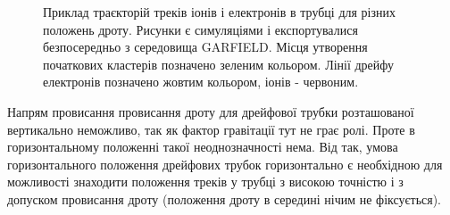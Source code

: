 	\begin{figure}[h!]
		\centering
		\qquad
		\caption{ Приклад траєкторій треків іонів і електронів в трубці для різних положень дроту. Рисунки є симуляціями і експортувалися безпосередньо з середовища GARFIELD. Місця утворення початкових кластерів позначено зеленим кольором. Лінії дрейфу електронів позначено жовтим кольором, іонів - червоним.}
	\end{figure}
	
	Напрям провисання провисання дроту для дрейфової трубки розташованої вертикально неможливо, так як фактор гравітації тут не грає ролі. Проте в горизонтальному положенні такої неоднозначності нема. Від так, умова горизонтального положення дрейфових трубок горизонтально є необхідною для можливості знаходити положення треків у трубці з високою точністю і з допуском провисання дроту (положення дроту в середині нічим не фіксується).
	
